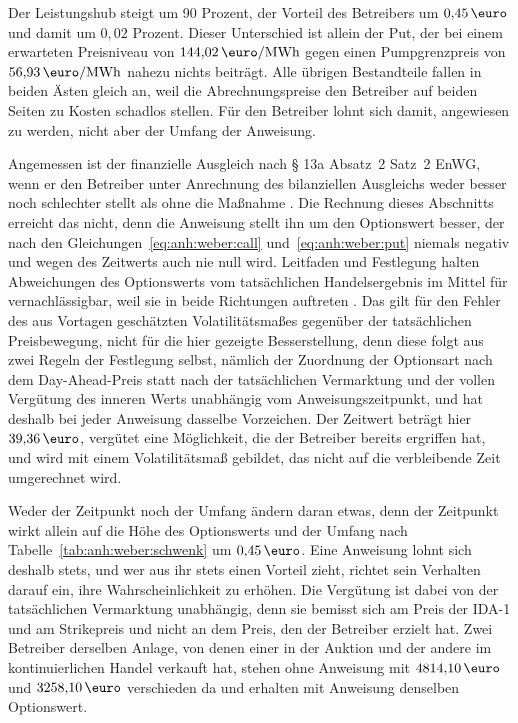Der Leistungshub steigt um 90 Prozent, der Vorteil des Betreibers um $0{,}45\,\text{\euro}$ und damit um $0{,}02$ Prozent. Dieser Unterschied ist allein der Put, der bei einem erwarteten Preisniveau von $144{,}02\,\si{\text{\euro}\per MWh}$ gegen einen Pumpgrenzpreis von $56{,}93\,\si{\text{\euro}\per MWh}$ nahezu nichts beiträgt. Alle übrigen Bestandteile fallen in beiden Ästen gleich an, weil die Abrechnungspreise den Betreiber auf beiden Seiten zu Kosten schadlos stellen. Für den Betreiber lohnt sich damit, angewiesen zu werden, nicht aber der Umfang der Anweisung.

Angemessen ist der finanzielle Ausgleich nach § 13a Absatz~2 Satz~2 EnWG, wenn er den Betreiber unter Anrechnung des bilanziellen Ausgleichs weder besser noch schlechter stellt als ohne die Maßnahme \cite{bundesministerium_der_justiz_energiewirtschaftsgesetz_2025}. Die Rechnung dieses Abschnitts erreicht das nicht, denn die Anweisung stellt ihn um den Optionswert besser, der nach den Gleichungen~\eqref{eq:anh:weber:call} und~\eqref{eq:anh:weber:put} niemals negativ und wegen des Zeitwerts auch nie null wird. Leitfaden und Festlegung halten Abweichungen des Optionswerts vom tatsächlichen Handelsergebnis im Mittel für vernachlässigbar, weil sie in beide Richtungen auftreten \cite{bdew_branchenleitfaden_2018, bundesnetzagentur_anlage1_2024}. Das gilt für den Fehler des aus Vortagen geschätzten Volatilitätsmaßes gegenüber der tatsächlichen Preisbewegung, nicht für die hier gezeigte Besserstellung, denn diese folgt aus zwei Regeln der Festlegung selbst, nämlich der Zuordnung der Optionsart nach dem Day-Ahead-Preis statt nach der tatsächlichen Vermarktung und der vollen Vergütung des inneren Werts unabhängig vom Anweisungszeitpunkt, und hat deshalb bei jeder Anweisung dasselbe Vorzeichen. Der Zeitwert beträgt hier $39{,}36\,\text{\euro}$, vergütet eine Möglichkeit, die der Betreiber bereits ergriffen hat, und wird mit einem Volatilitätsmaß gebildet, das nicht auf die verbleibende Zeit umgerechnet wird.

Weder der Zeitpunkt noch der Umfang ändern daran etwas, denn der Zeitpunkt wirkt allein auf die Höhe des Optionswerts und der Umfang nach Tabelle~\ref{tab:anh:weber:schwenk} um $0{,}45\,\text{\euro}$. Eine Anweisung lohnt sich deshalb stets, und wer aus ihr stets einen Vorteil zieht, richtet sein Verhalten darauf ein, ihre Wahrscheinlichkeit zu erhöhen. Die Vergütung ist dabei von der tatsächlichen Vermarktung unabhängig, denn sie bemisst sich am Preis der \ac{IDA-1} und am Strikepreis und nicht an dem Preis, den der Betreiber erzielt hat. Zwei Betreiber derselben Anlage, von denen einer in der Auktion und der andere im kontinuierlichen Handel verkauft hat, stehen ohne Anweisung mit $4814{,}10\,\text{\euro}$ und $3258{,}10\,\text{\euro}$ verschieden da und erhalten mit Anweisung denselben Optionswert.

